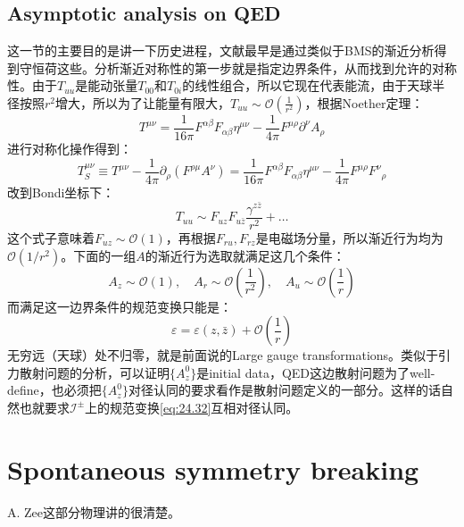 \subsection{Asymptotic analysis on QED}
这一节的主要目的是讲一下历史进程，文献最早是通过类似于BMS的渐近分析得到守恒荷这些\cite{Strominger:2013lka,He:2014cra}。分析渐近对称性的第一步就是指定边界条件，从而找到允许的对称性。由于$T_{uu}$是能动张量$T_{00}$和$T_{0i}$的线性组合，所以它现在代表能流，由于天球半径按照$r^2$增大，所以为了让能量有限大，$T_{uu}\sim\mathcal{O}\left(\frac{1}{r^2}\right)$，根据Noether定理：
\begin{equation}
	T^{\mu\nu}=\frac{1}{16\pi}F^{\alpha\beta}F_{\alpha\beta}\eta^{\mu\nu}-\frac{1}{4\pi}F^{\mu\rho}\partial^{\nu}A_{\rho}
\end{equation}
进行对称化操作得到：
\begin{equation}
	T_{S}^{\mu\nu}\equiv T^{\mu\nu}-\frac{1}{4\pi}\partial_{\rho}\left(F^{\rho\mu}A^{\nu}\right)=\frac{1}{16\pi}F^{\alpha\beta}F_{\alpha\beta}\eta^{\mu\nu}-\frac{1}{4\pi}F^{\mu\rho}{F^{\nu}}_{\rho}
\end{equation}
改到Bondi坐标下：
\begin{equation}
	T_{uu}\sim F_{uz}F_{u\bar{z}}\frac{\gamma^{z\bar{z}}}{r^2}+\ldots 
\end{equation}
这个式子意味着$F_{uz}\sim\mathcal{O}(1)$，再根据$F_{ru},F_{rz}$是电磁场分量，所以渐近行为均为$\mathcal{O}(1/r^2)$。下面的一组$A$的渐近行为选取就满足这几个条件：
\begin{equation}
	A_z\sim\mathcal{O}(1),\quad A_r\sim\mathcal{O}\left(\frac{1}{r^2}\right),\quad A_u\sim\mathcal{O}\left(\frac{1}{r}\right)
\end{equation}
而满足这一边界条件的规范变换只能是：
\begin{equation}\label{eq:24.32}
	\varepsilon=\varepsilon(z,\bar{z})+\mathcal{O}\left(\frac1r\right)
\end{equation}
无穷远（天球）处不归零，就是前面说的Large gauge transformations。类似于引力散射问题的分析，可以证明$\{A^0_z\}$是initial data，QED这边散射问题为了well-define，也必须把$\{A^0_z\}$对径认同的要求看作是散射问题定义的一部分。这样的话自然也就要求$\mathcal{I}^\pm$上的规范变换\ref{eq:24.32}互相对径认同。
\section{Spontaneous symmetry breaking}
A. Zee\cite{Zee:2010qce}这部分物理讲的很清楚。
